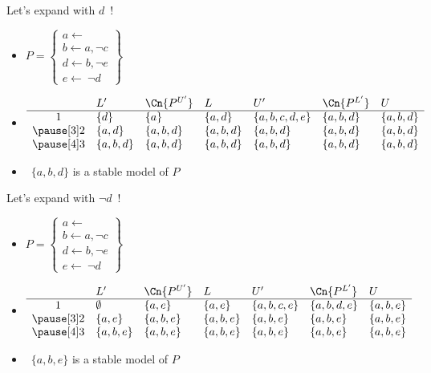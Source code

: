 \begin{frame}{Let's expand with $d$~!}
  \begin{itemize}
  \item<1-> []
    \(
      P
      =
      \left\{
        \begin{array}{l}
          a\leftarrow\\  b\leftarrow a,\neg c\\ d\leftarrow b,\neg e\\ e\leftarrow~\neg d
        \end{array}
      \right\}
    \)
  \item<2-> []
    \[
      \begin{array}{cllllll}
        & L'          & \Cn{P^{U'}} & L         & U'            & \Cn{P^{L'}} & U        \\
        \hline
        1 & \{d\}     & \{a\}       & \{a,d\}   & \{a,b,c,d,e\} & \{a,b,d\}   & \{a,b,d\}\\\pause[3]
        2 & \{a,d\}   & \{a,b,d\}   & \{a,b,d\} & \{a,b,d\}     & \{a,b,d\}   & \{a,b,d\}\\\pause[4]
        3 & \{a,b,d\} & \{a,b,d\}   & \{a,b,d\} & \{a,b,d\}     & \{a,b,d\}   & \{a,b,d\}
      \end{array}
    \]
    \medskip
  \item<5->  \ $\{a,b,d\}$ is a stable model of $P$
  \end{itemize}
\end{frame}
\begin{frame}{Let's expand with $\neg d$~!}
  \begin{itemize}
  \item<1-> []
    \(
      P
      =
      \left\{
        \begin{array}{l}
          a\leftarrow\\  b\leftarrow a,\neg c\\ d\leftarrow b,\neg e\\ e\leftarrow~\neg d
        \end{array}
      \right\}
    \)
  \item<2-> []
    \[
      \begin{array}{cllllll}
        & L'          & \Cn{P^{U'}} & L         & U'           & \Cn{P^{L'}} & U        \\
        \hline
        1 & \emptyset & \{a,e\}     & \{a,e\}   & \{a,b,c,e\}  & \{a,b,d,e\} & \{a,b,e\}\\\pause[3]
        2 & \{a,e\}   & \{a,b,e\}   & \{a,b,e\} & \{a,b,e\}    & \{a,b,e\}   & \{a,b,e\}\\\pause[4]
        3 & \{a,b,e\} & \{a,b,e\}   & \{a,b,e\} & \{a,b,e\}    & \{a,b,e\}   & \{a,b,e\}
      \end{array}
    \]
    \medskip
  \item<5->  \ $\{a,b,e\}$ is a stable model of $P$
  \end{itemize}
\end{frame}
